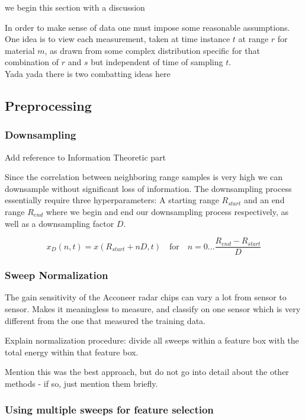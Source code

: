 \documentclass[a4paper, 12pt]{article}
\begin{document}
we begin this section with a discussion 



In order to make sense of data one must impose some reasonable assumptions. 
\\ 
One idea is to view each measurement, taken at time instance $t$ at range $r$ for material $m$, as drawn from some 
complex distribution specific for that combination of $r$ and $s$ but independent of time of sampling $t$. 
\\
Yada yada there is two combatting ideas here

\subsection{Preprocessing}

\subsubsection{Downsampling}
Add reference to Information Theoretic part

Since the correlation between neighboring range samples is very high we can downsample without significant loss of information. The downsampling process essentially require three hyperparameters: A starting range $R_{start}$ and an end range $R_{end}$ where we begin and end our downsampling process respectively, as well as a downsampling factor $D$.

\begin{equation}
	x_D(n, t) = x(R_{start} + nD, t) \quad \text{for}\quad n=0...\frac{R_{end}-R_{start}}{D}
\end{equation}

\subsubsection{Sweep Normalization}
The gain sensitivity of the Acconeer radar chips can vary a lot from sensor to sensor. Makes it meaningless to measure, and classify on one sensor which is very different from the one that measured the training data. 

Explain normalization procedure: divide all sweeps within a feature box with the total energy within that feature box. 

Mention this was the best approach, but do not go into detail about the other methods - if so, just mention them briefly.



\subsubsection{Using multiple sweeps for feature selection}
\end{document}
